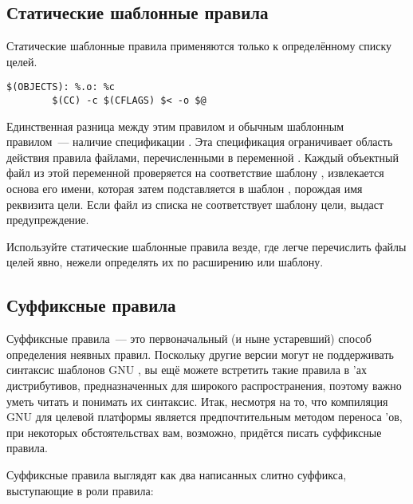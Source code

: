 \subsection{Статические шаблонные правила}
Статические шаблонные правила применяются только к определённому
списку целей.

{\footnotesize
\begin{verbatim}
$(OBJECTS): %.o: %c
        $(CC) -c $(CFLAGS) $< -o $@
\end{verbatim}
}

Единственная разница между этим правилом и обычным шаблонным
правилом~--- наличие спецификации . Эта
спецификация ограничивает область действия правила файлами,
перечисленными в переменной . Каждый объектный
файл из этой переменной проверяется на соответствие шаблону
, извлекается основа его имени, которая затем
подставляется в шаблон , порождая имя реквизита цели.
Если файл из списка не соответствует шаблону цели, \GNUmake{} выдаст
предупреждение.

Используйте статические шаблонные правила везде, где легче перечислить
файлы целей явно, нежели определять их по расширению или шаблону.

\subsection{Суффиксные правила} \label{sec:suffix_rules}
Суффиксные правила~--- это первоначальный (и ныне устаревший) способ
определения неявных правил. Поскольку другие версии \GNUmake{} могут
не поддерживать синтаксис шаблонов GNU \GNUmake{}, вы ещё можете
встретить такие правила в \Makefile{}'ах дистрибутивов,
предназначенных для широкого распространения, поэтому важно
уметь читать и понимать их синтаксис. Итак, несмотря на то, что
компиляция GNU \GNUmake{} для целевой платформы является
предпочтительным методом переноса \Makefile{}'ов, при некоторых
обстоятельствах вам, возможно, придётся писать суффиксные правила.

Суффиксные правила выглядят как два написанных слитно суффикса,
выступающие в роли правила:

